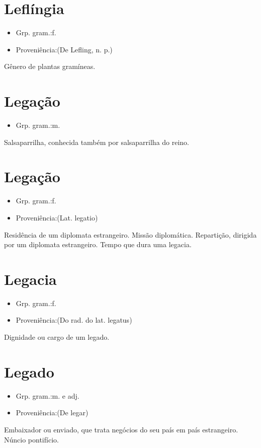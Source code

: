 \section{Leflíngia}
\begin{itemize}
\item {Grp. gram.:f.}
\end{itemize}
\begin{itemize}
\item {Proveniência:(De \textunderscore Lefling\textunderscore , n. p.)}
\end{itemize}
Gênero de plantas gramíneas.
\section{Legação}
\begin{itemize}
\item {Grp. gram.:m.}
\end{itemize}
Salsaparrilha, conhecida também por \textunderscore salsaparrilha do reino\textunderscore .
\section{Legação}
\begin{itemize}
\item {Grp. gram.:f.}
\end{itemize}
\begin{itemize}
\item {Proveniência:(Lat. \textunderscore legatio\textunderscore )}
\end{itemize}
Residência de um diplomata estrangeiro.
Missão diplomática.
Repartição, dirigida por um diplomata estrangeiro.
Tempo que dura uma legacia.
\section{Legacia}
\begin{itemize}
\item {Grp. gram.:f.}
\end{itemize}
\begin{itemize}
\item {Proveniência:(Do rad. do lat. \textunderscore legatus\textunderscore )}
\end{itemize}
Dignidade ou cargo de um legado.
\section{Legado}
\begin{itemize}
\item {Grp. gram.:m.  e  adj.}
\end{itemize}
\begin{itemize}
\item {Proveniência:(De \textunderscore legar\textunderscore )}
\end{itemize}
Embaixador ou enviado, que trata negócios do seu país em país estrangeiro.
Núncio pontifício.
